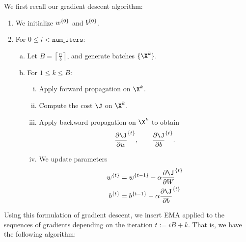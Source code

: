 We first recall our gradient descent algorithm:
\begin{enumerate}
	\item We initialize ${w}^{\{{0}\}}$ and ${b}^{\{{0}\}}$.
	\item For $0\leq i<\texttt{num\_iters}$:
		\begin{enumerate}[a.]
			\item Let $B=\left\lceil\frac{n}{b}\right\rceil$, and generate batches $\{\X^k\}$.
			\item For $1\leq k\leq B$:
			\begin{enumerate}[i.]
				\item Apply forward propagation on $\X^k$.
				\item Compute the cost $\J$ on $\X^k$.
				\item Apply backward propagation on $\X^k$ to obtain
				$$\iter{\frac{\partial\J}{\partial w}}{t},\qquad \iter{\frac{\partial\J}{\partial b}}{t}.$$
				\item We update parameters
				\begin{align*}
					\iter{w}{t}&=\iter{w}{t-1}-\alpha\iter{\frac{\partial\J}{\partial W}}{t}\\
					\iter{b}{t}&=\iter{b}{t-1}-\alpha\iter{\frac{\partial\J}{\partial b}}{t}
				\end{align*}
			\end{enumerate}
		\end{enumerate}
\end{enumerate}
Using this formulation of gradient descent, we insert EMA applied to the sequences of gradients depending on the iteration $t:=iB+k$.  That is, we have the following algorithm:
